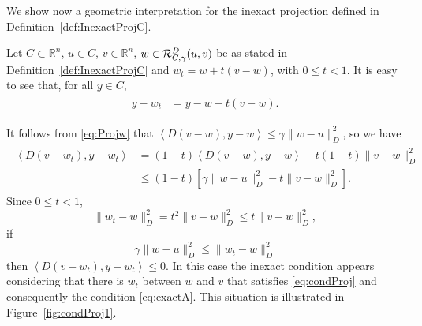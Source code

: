 We show now a geometric interpretation for the inexact projection defined in Definition~\ref{def:InexactProjC}.
\begin{remark}\normalfont
	Let $C\subset \mathbb{R}^n$, $u\in C$, $v\in \mathbb{R}^n$, $w\in{\cal R}_{C,\gamma}^{D}(u, v)$ be as stated in Definition~\ref{def:InexactProjC} and $w_t = w+t(v-w)$, with $0\leq t <1$. It is easy to see that, for all $y\in C$,
	\begin{align*}
		\begin{aligned}
			y-w_t & = y-w - t(v-w).
		\end{aligned}
	\end{align*}
\end{remark}
It follows from \eqref{eq:Projw} that $\left\langle D(v-w), y-w \right\rangle \leq \gamma \|w-u\|_{D}^2$, so we have
\begin{align*}
	\begin{aligned}
		\left\langle D(v-w_t), y-w_t \right\rangle & = (1-t)\left\langle D(v-w), y-w \right\rangle - t(1-t)\|v-w\|_D^{2} \\
		                                           & \leq  (1-t)\left[ \gamma \|w-u\|_D^2 - t\|v-w\|_D^2 \right].
	\end{aligned}
\end{align*}
Since $0\leq t<1$,
$$
	\|w_t-w\|_D^2 = t^2 \|v-w\|_D^2 \leq t\|v-w\|_D^2,
$$
if
\begin{equation}\label{eq:condProj}
	\gamma \|w-u\|_D^2 \leq \|w_t-w\|_D^2
\end{equation}
then $\left\langle D(v-w_t), y-w_t \right\rangle\leq 0$. In this case the inexact condition appears considering that there is $w_t$ between $w$ and $v$ that satisfies \eqref{eq:condProj} and consequently the condition \eqref{eq:exactA}.  This situation is illustrated in Figure~\ref{fig:condProj1}.


